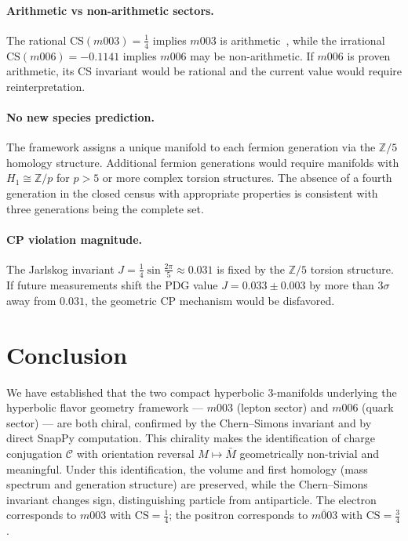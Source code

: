 \documentclass[12pt]{article}
\theoremstyle{definition}
\begin{document}
\paragraph{Arithmetic vs non-arithmetic sectors.}
The rational $\mathrm{CS}(m003) = \tfrac{1}{4}$ implies $m003$ is
arithmetic~\cite{Chinburg98}, while the irrational $\mathrm{CS}(m006)
= -0.1141$ implies $m006$ may be non-arithmetic. If $m006$ is proven
arithmetic, its CS invariant would be rational and the current value
would require reinterpretation.

\paragraph{No new species prediction.}
The framework assigns a unique manifold to each fermion generation via
the $\mathbb{Z}/5$ homology structure. Additional fermion generations
would require manifolds with $H_1 \cong \mathbb{Z}/p$ for $p > 5$ or
more complex torsion structures. The absence of a fourth generation
in the closed census with appropriate properties is consistent with
three generations being the complete set.

\paragraph{CP violation magnitude.}
The Jarlskog invariant $J = \tfrac{1}{4}\sin\tfrac{2\pi}{5} \approx
0.031$ is fixed by the $\mathbb{Z}/5$ torsion structure. If future
measurements shift the PDG value $J = 0.033 \pm 0.003$ by more than
$3\sigma$ away from $0.031$, the geometric CP mechanism would be
disfavored.

\section{Conclusion}
\label{sec:conclusion}

We have established that the two compact hyperbolic 3-manifolds
underlying the hyperbolic flavor geometry framework --- $m003$ (lepton
sector) and $m006$ (quark sector) --- are both chiral, confirmed by the
Chern--Simons invariant and by direct SnapPy computation. This chirality
makes the identification of charge conjugation $\mathcal{C}$ with
orientation reversal $M \mapsto \bar{M}$ geometrically non-trivial and
meaningful. Under this identification, the volume and first homology
(mass spectrum and generation structure) are preserved, while the
Chern--Simons invariant changes sign, distinguishing particle from
antiparticle. The electron corresponds to $m003$ with
$\mathrm{CS} = \tfrac{1}{4}$; the positron corresponds to
$\overline{m003}$ with $\mathrm{CS} = \tfrac{3}{4}$.
\end{document}
